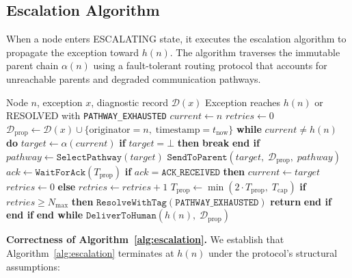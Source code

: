 \subsection{Escalation Algorithm}
\label{sec:bp-escalation}

When a node enters ESCALATING state, it executes the escalation algorithm to propagate the exception toward $h(n)$. The algorithm traverses the immutable parent chain $\alpha(n)$ using a fault-tolerant routing protocol that accounts for unreachable parents and degraded communication pathways.

\bigskip
\begin{algorithm}
\label{alg:escalation}
\begin{algorithmic}
\REQUIRE Node $n$, exception $x$, diagnostic record $\mathcal{D}(x)$
\ENSURE Exception reaches $h(n)$ or RESOLVED with \texttt{PATHWAY\_EXHAUSTED}
\STATE $current \leftarrow n$
\STATE $retries \leftarrow 0$
\STATE $\mathcal{D}_{\text{prop}} \leftarrow \mathcal{D}(x) \cup \{ \text{originator} = n, \; \text{timestamp} = t_{\text{now}} \}$
\STATE \textbf{while} $current \neq h(n)$ \textbf{do}
    \STATE $target \leftarrow \alpha(current)$
    \STATE \textbf{if} $target = \bot$ \textbf{then}
        \STATE \textbf{break} 
    \STATE \textbf{end if}
    \STATE $pathway \leftarrow \texttt{SelectPathway}(target)$ 
    \STATE $\texttt{SendToParent}(target, \; \mathcal{D}_{\text{prop}}, \; pathway)$
    \STATE $ack \leftarrow \texttt{WaitForAck}(T_{\text{prop}})$
    \STATE \textbf{if} $ack = \texttt{ACK\_RECEIVED}$ \textbf{then}
        \STATE $current \leftarrow target$ 
        \STATE $retries \leftarrow 0$
    \STATE \textbf{else}
        \STATE $retries \leftarrow retries + 1$
        \STATE $T_{\text{prop}} \leftarrow \min(2 \cdot T_{\text{prop}},\; T_{\text{cap}})$
        \STATE \textbf{if} $retries \geq N_{\max}$ \textbf{then}
            \STATE $\texttt{ResolveWithTag}(\texttt{PATHWAY\_EXHAUSTED})$
            \STATE \textbf{return}
        \STATE \textbf{end if}
    \STATE \textbf{end if}
\STATE \textbf{end while}
\STATE $\texttt{DeliverToHuman}(h(n), \; \mathcal{D}_{\text{prop}})$
\end{algorithmic}
\end{algorithm}

\bigskip
\noindent\textbf{Correctness of Algorithm~\ref{alg:escalation}.} We establish that Algorithm~\ref{alg:escalation} terminates at $h(n)$ under the protocol's structural assumptions:

